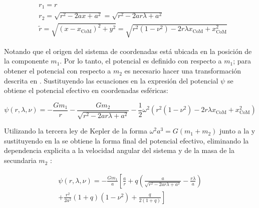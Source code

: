 \begin{eqfloat}
	\centering
	\begin{equation}
		\begin{split}
			& r_1 = r \\
			& r_2 = \sqrt{r^2 - 2ax + a^2} = \sqrt{r^2 - 2ar\lambda + a^2} \\
			& \tilde{r} = \sqrt{(x - x_{\textrm{CoM}})^2 + y^2} = \sqrt{r^2(1 - \nu^2) - 2r\lambda x_{\textrm{CoM}} + x_{\textrm{CoM}}^2}
		\end{split}
	\end{equation}
	\blankcaption
	\label{ecuacionesDistancias}
\end{eqfloat}

Notando que el origen del sistema de coordenadas está ubicada en la posición de
la componente $m_1$. Por lo tanto, el potencial es definido con respecto a
$m_1$; para obtener el potencial con respecto a $m_2$ es necesario hacer una
transformación descrita en .
Sustituyendo las ecuaciones  en la expresión
del potencial $\psi$ se obtiene el potencial efectivo en coordenadas esféricas:

\begin{eqfloat}[!ht]
	\centering
	\begin{equation}
		\psi(r, \lambda, \nu) = -\frac{Gm_1}{r} - \frac{Gm_2}{\sqrt{r^2 - 2ar\lambda + a^2}} - \frac{1}{2} \omega^2 (r^2(1-\nu^2) - 2r\lambda x_{\textrm{CoM}} + x_{\textrm{CoM}}^2)
	\end{equation}
	\blankcaption
	\label{ecuacionPotencialEfectivoEsferico}
\end{eqfloat}

Utilizando la tercera ley de Kepler de la forma $\omega^2 a^3 = G(m_1 + m_2)$
junto a la  y sustituyendo en la
 se obtiene la forma final del
potencial efectivo, eliminando la dependencia explicita a la velocidad angular
del sistema y de la masa de la secundaria $m_2$
:

\begin{eqfloat}[!ht]
	\centering
	\begin{equation}
		\begin{split}
			\psi(r, \lambda, \nu) = -\frac{G m_1}{a} \left[ \frac{a}{r} + q \left(\frac{a}{\sqrt{r^2 - 2ar\lambda + a^2}} - \frac{r\lambda}{a} \right) \right.\\
			\left. + \frac{r^2}{2a^2}(1 + q)(1 - \nu^2) + \frac{q}{2(1 + q)} \right]
		\end{split}
	\end{equation}
	\blankcaption
	\label{ecuacionPotencialEfectivoFinal}
\end{eqfloat}

